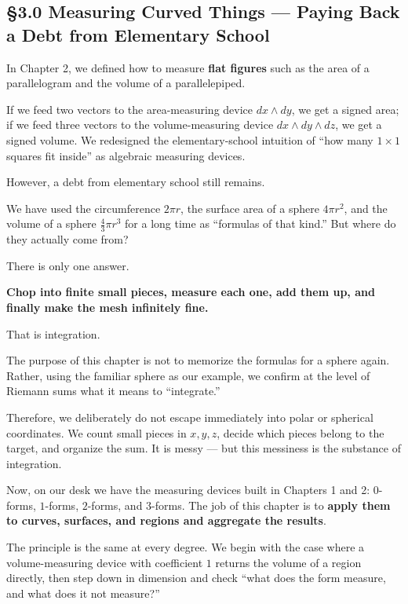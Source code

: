 \hypertarget{measuring-curved-things-paying-back-a-debt-from-elementary-school}{%
\subsection{§3.0 Measuring Curved Things --- Paying Back a Debt from
Elementary
School}\label{measuring-curved-things-paying-back-a-debt-from-elementary-school}}

In Chapter 2, we defined how to measure \textbf{flat figures} such as
the area of a parallelogram and the volume of a parallelepiped.

If we feed two vectors to the area-measuring device \(dx \wedge dy\), we
get a signed area; if we feed three vectors to the volume-measuring
device \(dx \wedge dy \wedge dz\), we get a signed volume. We redesigned
the elementary-school intuition of ``how many \(1\times 1\) squares fit
inside'' as algebraic measuring devices.

However, a debt from elementary school still remains.

We have used the circumference \(2\pi r\), the surface area of a sphere
\(4\pi r^2\), and the volume of a sphere \(\frac{4}{3}\pi r^3\) for a
long time as ``formulas of that kind.'' But where do they actually come
from?

There is only one answer.

\textbf{Chop into finite small pieces, measure each one, add them up, and finally make the mesh infinitely fine.}

That is integration.

The purpose of this chapter is not to memorize the formulas for a sphere
again. Rather, using the familiar sphere as our example, we confirm at
the level of Riemann sums what it means to ``integrate.''

Therefore, we deliberately do not escape immediately into polar or
spherical coordinates. We count small pieces in \(x,y,z\), decide which
pieces belong to the target, and organize the sum. It is messy --- but
this messiness is the substance of integration.

Now, on our desk we have the measuring devices built in Chapters 1 and
2: \(0\)-forms, \(1\)-forms, \(2\)-forms, and \(3\)-forms. The job of
this chapter is to
\textbf{apply them to curves, surfaces, and regions and aggregate the results}.

The principle is the same at every degree. We begin with the case where
a volume-measuring device with coefficient \(1\) returns the volume of a
region directly, then step down in dimension and check ``what does the
form measure, and what does it not measure?''

